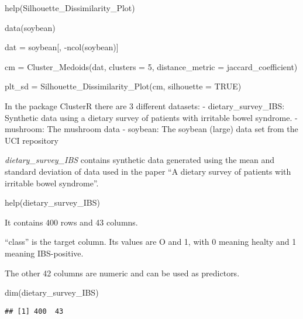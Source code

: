 \documentclass[
]{article}
\newenvironment{Shaded}{\begin{snugshade}}{\end{snugshade}}
\newcommand{\AttributeTok}[1]{\textcolor[rgb]{0.77,0.63,0.00}{#1}}
\newcommand{\ConstantTok}[1]{\textcolor[rgb]{0.00,0.00,0.00}{#1}}
\newcommand{\DecValTok}[1]{\textcolor[rgb]{0.00,0.00,0.81}{#1}}
\newcommand{\FunctionTok}[1]{\textcolor[rgb]{0.00,0.00,0.00}{#1}}
\newcommand{\NormalTok}[1]{#1}
\newcommand{\OtherTok}[1]{\textcolor[rgb]{0.56,0.35,0.01}{#1}}
\newcommand{\SpecialCharTok}[1]{\textcolor[rgb]{0.00,0.00,0.00}{#1}}
\newcommand{\StringTok}[1]{\textcolor[rgb]{0.31,0.60,0.02}{#1}}
\begin{document}
\begin{Shaded}
\begin{Highlighting}[]
\FunctionTok{help}\NormalTok{(Silhouette\_Dissimilarity\_Plot)}

\FunctionTok{data}\NormalTok{(soybean)}

\NormalTok{dat }\OtherTok{=}\NormalTok{ soybean[, }\SpecialCharTok{{-}}\FunctionTok{ncol}\NormalTok{(soybean)]}

\NormalTok{cm }\OtherTok{=} \FunctionTok{Cluster\_Medoids}\NormalTok{(dat, }\AttributeTok{clusters =} \DecValTok{5}\NormalTok{, }\AttributeTok{distance\_metric =} \StringTok{\textquotesingle{}jaccard\_coefficient\textquotesingle{}}\NormalTok{)}

\NormalTok{plt\_sd }\OtherTok{=} \FunctionTok{Silhouette\_Dissimilarity\_Plot}\NormalTok{(cm, }\AttributeTok{silhouette =} \ConstantTok{TRUE}\NormalTok{)}
\end{Highlighting}
\end{Shaded}

In the package ClusterR there are 3 different datasets: -
dietary\_survey\_IBS: Synthetic data using a dietary survey of patients
with irritable bowel syndrome. - mushroom: The mushroom data - soybean:
The soybean (large) data set from the UCI repository

\emph{dietary\_survey\_IBS} contains synthetic data generated using the
mean and standard deviation of data used in the paper ``A dietary survey
of patients with irritable bowel syndrome''.

\begin{Shaded}
\begin{Highlighting}[]
\FunctionTok{help}\NormalTok{(dietary\_survey\_IBS)}
\end{Highlighting}
\end{Shaded}

It contains 400 rows and 43 columns.

``class'' is the target column. Its values are O and 1, with 0 meaning
healty and 1 meaning IBS-positive.

The other 42 columns are numeric and can be used as predictors.

\begin{Shaded}
\begin{Highlighting}[]
\FunctionTok{dim}\NormalTok{(dietary\_survey\_IBS)}
\end{Highlighting}
\end{Shaded}

\begin{verbatim}
## [1] 400  43
\end{verbatim}
\end{document}

